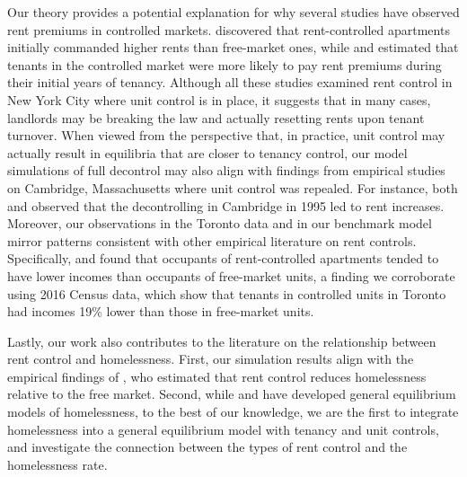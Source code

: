 \documentclass[parskip=full]{article}
\begin{document}
Our theory provides a potential explanation for why several studies have observed rent premiums in controlled markets. \citet{nagy-1997} discovered that rent-controlled apartments initially commanded higher rents than free-market ones, while \citet{early-2000} and \citet{cjq-2023} estimated that tenants in the controlled market were more likely to pay rent premiums during their initial years of tenancy. Although all these studies examined rent control in New York City where unit control is in place, it suggests that in many cases, landlords may be breaking the law and actually resetting rents upon tenant turnover. When viewed from the perspective that, in practice, unit control may actually result in equilibria that are closer to tenancy control, our model simulations of full decontrol may also align with findings from empirical studies on Cambridge, Massachusetts where unit control was repealed. For instance, both \citet{sims-2007} and \citet{app-2014} observed that the decontrolling in Cambridge in 1995 led to rent increases. Moreover, our observations in the Toronto data and in our benchmark model mirror patterns consistent with other empirical literature on rent controls. Specifically, \citet{oslen-1972} and \citet{gl-1989} found that occupants of rent-controlled apartments tended to have lower incomes than occupants of free-market units, a finding we corroborate using 2016 Census data, which show that tenants in controlled units in Toronto had incomes 19\% lower than those in free-market units.

Lastly, our work also contributes to the literature on the relationship between rent control and homelessness. First, our simulation results align with the empirical findings of \citet{eo-1998}, who estimated that rent control reduces homelessness relative to the free market. Second, while \citet{az-2024} and \citet{abramson-2024} have developed general equilibrium models of homelessness, to the best of our knowledge, we are the first to integrate homelessness into a general equilibrium model with tenancy and unit controls, and investigate the connection between the types of rent control and the homelessness rate.
\end{document}
